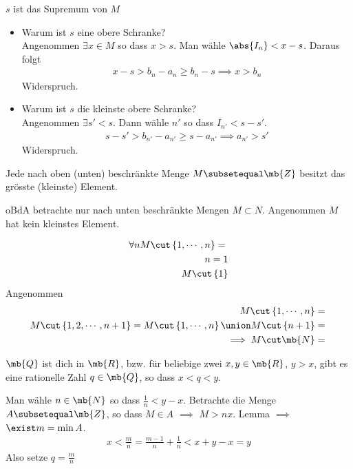 \begin{Beh}
  $s$ ist das Supremum von $M$
  \begin{itemize}
    \item Warum ist $s$ eine obere Schranke? \\
    Angenommen $\exists x\in M$ so dass $x>s$. Man wähle $\abs{I_n}<x-s$. Daraus folgt
    \begin{align*}
      x-s>b_n-a_n \geq b_n-s \implies x>b_n
    \end{align*}
    Widerspruch.
  \item Warum ist $s$ die kleinste obere Schranke?\\
    Angenommen $\exists s'<s$. Dann wähle $n'$ so dass $I_{n'} <s-s'$.
    \begin{align*}
      s-s'>b_{n'}-a_{n'}\geq s-a_{n'} \implies a_{n'}>s'
    \end{align*}
    Widerspruch.
  \end{itemize}
\end{Beh}
\begin{Lem}
  Jede nach oben (unten) beschränkte Menge $M\subsetequal \mb{Z}$ besitzt das grösste (kleinste) Element.
\end{Lem}
\begin{Bew}
  oBdA betrachte nur nach unten beschränkte Mengen $M\subset N$. Angenommen $M$ hat kein kleinstes Element.
\end{Bew}
\begin{Beh}
  \begin{align*}
    \forall n M\cut \left\{ 1,\cdots,n \right\} = \null\\
    n=1\\
    M\cut\left\{ 1 \right\}\\
  \end{align*}
  Angenommen
  \begin{align*}
    M\cut\left\{ 1,\cdots,n \right\} = \null\\
    M\cut\left\{ 1,2,\cdots,n+1 \right\} = M\cut \left\{ 1,\cdots,n \right\}\union M\cut\left\{ n+1 \right\}=\null\\
    \implies M\cut\mb{N}=\null
  \end{align*}
\end{Beh}
\begin{Sat}
  $\mb{Q}$ ist dich in $\mb{R}$, bzw. für beliebige zwei $x,y\in\mb{R}$, $y>x$, gibt es eine rationelle Zahl $q\in\mb{Q}$, so dass $x<q<y$.
\end{Sat}
\begin{Bew}
  Man wähle $n\in\mb{N}$ so dass $\frac{1}{n}<y-x$. Betrachte die Menge $A\subsetequal\mb{Z}$, so dass $M\in A$ $\implies$ $M>nx$. Lemma $\implies$ $\exist m=\min A$.
  \begin{align*}
    x<\frac{m}{n}=\frac{m-1}{n}+\frac{1}{n}<x+y-x=y
  \end{align*}
  Also setze $q=\frac{m}{n}$
\end{Bew}
